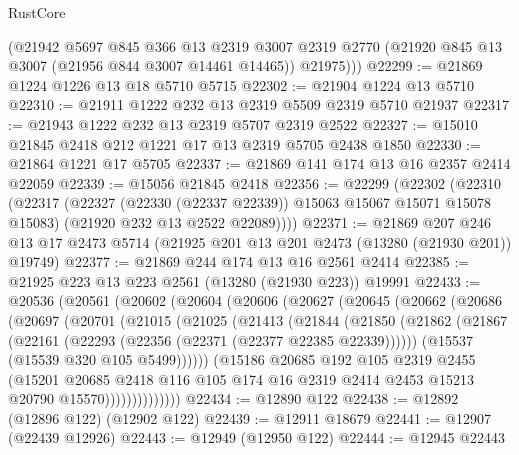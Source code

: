 \begin{lexlean}{RustCore}
\begin{coremodule}
        (@21942
          @5697
          @845
          @366
          @13
          @2319
          @3007
          @2319
          @2770
          (@21920 @845 @13 @3007 (@21956 @844 @3007 @14461 @14465))
          @21975)))
@22299 := @21869 @1224 @1226 @13 @18 @5710 @5715
@22302 := @21904 @1224 @13 @5710
@22310 := @21911 @1222 @232 @13 @2319 @5509 @2319 @5710 @21937
@22317 := @21943 @1222 @232 @13 @2319 @5707 @2319 @2522
@22327 := @15010 @21845 @2418 @212 @1221 @17 @13 @2319 @5705 @2438 @1850
@22330 := @21864 @1221 @17 @5705
@22337 := @21869 @141 @174 @13 @16 @2357 @2414 @22059
@22339 := @15056 @21845 @2418
@22356 := @22299
    (@22302
      (@22310
        (@22317
          (@22327 (@22330 (@22337 @22339)) @15063 @15067 @15071 @15078 @15083)
          (@21920 @232 @13 @2522 @22089))))
@22371 := @21869
    @207
    @246
    @13
    @17
    @2473
    @5714
    (@21925 @201 @13 @201 @2473 (@13280 (@21930 @201)) @19749)
@22377 := @21869 @244 @174 @13 @16 @2561 @2414
@22385 := @21925 @223 @13 @223 @2561 (@13280 (@21930 @223)) @19991
@22433 := @20536
    (@20561
      (@20602
        (@20604
          (@20606
            (@20627
              (@20645
                (@20662
                  (@20686
                    (@20697
                      (@20701
                        (@21015
                          (@21025
                            (@21413
                              (@21844
                                (@21850
                                  (@21862
                                    (@21867
                                      (@22161 (@22293 (@22356 (@22371 (@22377 @22385 @22339))))))
                                    (@15537 (@15539 @320 @105 @5499))))))
                            (@15186
                              @20685
                              @192
                              @105
                              @2319
                              @2455
                              (@15201
                                @20685
                                @2418
                                @116
                                @105
                                @174
                                @16
                                @2319
                                @2414
                                @2453
                                @15213
                                @20790
                                @15570))))))))))))))
@22434 := @12890 @122
@22438 := @12892 (@12896 @122) (@12902 @122)
@22439 := @12911 @18679
@22441 := @12907 (@22439 @12926)
@22443 := @12949 (@12950 @122)
@22444 := @12945 @22443

\end{coremodule}
\end{lexlean}
